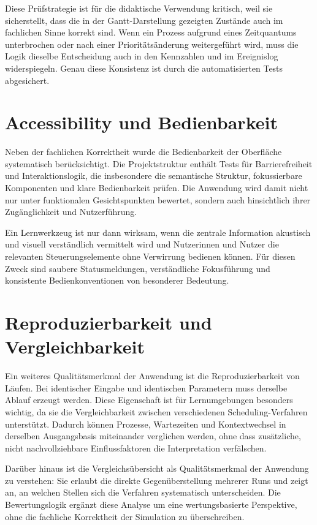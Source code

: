 Diese Prüfstrategie ist für die didaktische Verwendung kritisch, weil sie sicherstellt, dass die in der Gantt-Darstellung gezeigten Zustände auch im fachlichen Sinne korrekt sind. Wenn ein Prozess aufgrund eines Zeitquantums unterbrochen oder nach einer Prioritätsänderung weitergeführt wird, muss die Logik dieselbe Entscheidung auch in den Kennzahlen und im Ereignislog widerspiegeln. Genau diese Konsistenz ist durch die automatisierten Tests abgesichert.

\section{Accessibility und Bedienbarkeit}

Neben der fachlichen Korrektheit wurde die Bedienbarkeit der Oberfläche systematisch berücksichtigt. Die Projektstruktur enthält Tests für Barrierefreiheit und Interaktionslogik, die insbesondere die semantische Struktur, fokussierbare Komponenten und klare Bedienbarkeit prüfen. Die Anwendung wird damit nicht nur unter funktionalen Gesichtspunkten bewertet, sondern auch hinsichtlich ihrer Zugänglichkeit und Nutzerführung.

Ein Lernwerkzeug ist nur dann wirksam, wenn die zentrale Information akustisch und visuell verständlich vermittelt wird und Nutzerinnen und Nutzer die relevanten Steuerungselemente ohne Verwirrung bedienen können. Für diesen Zweck sind saubere Statusmeldungen, verständliche Fokusführung und konsistente Bedienkonventionen von besonderer Bedeutung.

\section{Reproduzierbarkeit und Vergleichbarkeit}

Ein weiteres Qualitätsmerkmal der Anwendung ist die Reproduzierbarkeit von Läufen. Bei identischer Eingabe und identischen Parametern muss derselbe Ablauf erzeugt werden. Diese Eigenschaft ist für Lernumgebungen besonders wichtig, da sie die Vergleichbarkeit zwischen verschiedenen Scheduling-Verfahren unterstützt. Dadurch können Prozesse, Wartezeiten und Kontextwechsel in derselben Ausgangsbasis miteinander verglichen werden, ohne dass zusätzliche, nicht nachvollziehbare Einflussfaktoren die Interpretation verfälschen.

Darüber hinaus ist die Vergleichsübersicht als Qualitätsmerkmal der Anwendung zu verstehen: Sie erlaubt die direkte Gegenüberstellung mehrerer Runs und zeigt an, an welchen Stellen sich die Verfahren systematisch unterscheiden. Die Bewertungslogik ergänzt diese Analyse um eine wertungsbasierte Perspektive, ohne die fachliche Korrektheit der Simulation zu überschreiben.


